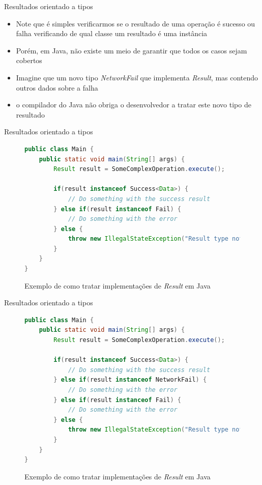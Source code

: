 \documentclass[brazilian]{beamer}
\begin{document}
\begin{frame}{Resultados orientado a tipos}
    \begin{itemize}
        \item Note que é simples verificarmos se o resultado de uma operação é sucesso ou falha verificando de qual classe um resultado é uma instância
        \item Porém, em Java, não existe um meio de garantir que todos os casos sejam cobertos
        \item Imagine que um novo tipo \emph{NetworkFail} que implementa \emph{Result}, mas contendo outros dados sobre a falha
        \item o compilador do Java não obriga o desenvolvedor a tratar este novo tipo de resultado
    \end{itemize}
\end{frame}

\begin{frame}[fragile]{Resultados orientado a tipos}
    \begin{itemize}
        \begin{figure}[H]
            \centering
            \begin{lstlisting}[language=Java]
public class Main {
    public static void main(String[] args) {
        Result result = SomeComplexOperation.execute();
        
        if(result instanceof Success<Data>) {
            // Do something with the success result
        } else if(result instanceof Fail) {
            // Do something with the error
        } else {
            throw new IllegalStateException("Result type not implemented")
        }
    }
}
            \end{lstlisting}
            \caption{Exemplo de como tratar implementações de \emph{Result} em Java}
            \label{fig:java_fail_result_implementation}
        \end{figure}
    \end{itemize}
\end{frame}

\begin{frame}[fragile]{Resultados orientado a tipos}
    \begin{figure}[H]
        \centering
        \begin{lstlisting}[language=Java]
public class Main {
    public static void main(String[] args) {
        Result result = SomeComplexOperation.execute();
        
        if(result instanceof Success<Data>) {
            // Do something with the success result
        } else if(result instanceof NetworkFail) {
            // Do something with the error
        } else if(result instanceof Fail) {
            // Do something with the error
        } else {
            throw new IllegalStateException("Result type not implemented")
        }
    }
}
        \end{lstlisting}
        \caption{Exemplo de como tratar implementações de \emph{Result} em Java}
        \label{fig:java_fail_result_implementation}
    \end{figure}
\end{frame}
\end{document}
